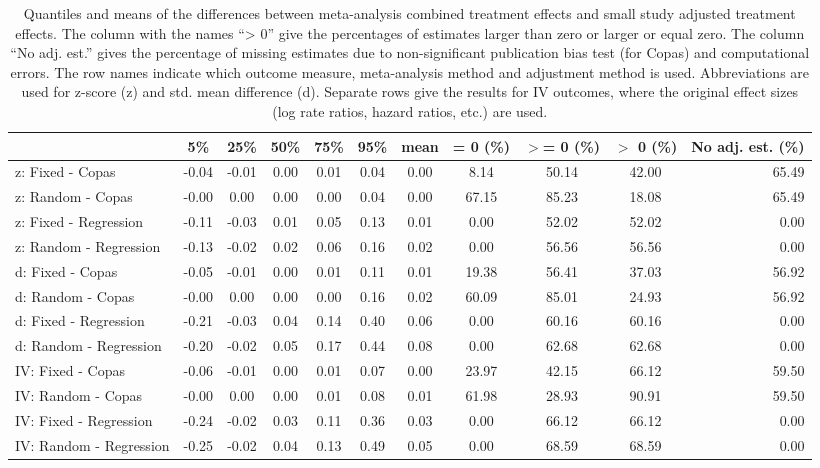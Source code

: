 \documentclass[11pt,a4paper,twoside]{book}\usepackage[]{graphicx}\usepackage[]{color}
\begin{document}
\begin{table}[ht]
\centering
\begingroup\scriptsize
\begin{tabular}{lcccccccccr}
  \hline
 & 5\% & 25\% & 50\% & 75\% & 95\% & mean & = 0 (\%) & $>$= 0 (\%) & $>$ 0 (\%) & No adj. est. (\%) \\ 
  \hline
z: Fixed - Copas & -0.04 & -0.01 & 0.00 & 0.01 & 0.04 & 0.00 & 8.14 & 50.14 & 42.00 & 65.49 \\ 
  z: Random - Copas & -0.00 & 0.00 & 0.00 & 0.00 & 0.04 & 0.00 & 67.15 & 85.23 & 18.08 & 65.49 \\ 
  z: Fixed - Regression & -0.11 & -0.03 & 0.01 & 0.05 & 0.13 & 0.01 & 0.00 & 52.02 & 52.02 & 0.00 \\ 
  z: Random - Regression & -0.13 & -0.02 & 0.02 & 0.06 & 0.16 & 0.02 & 0.00 & 56.56 & 56.56 & 0.00 \\ 
  d: Fixed - Copas & -0.05 & -0.01 & 0.00 & 0.01 & 0.11 & 0.01 & 19.38 & 56.41 & 37.03 & 56.92 \\ 
  d: Random - Copas & -0.00 & 0.00 & 0.00 & 0.00 & 0.16 & 0.02 & 60.09 & 85.01 & 24.93 & 56.92 \\ 
  d: Fixed - Regression & -0.21 & -0.03 & 0.04 & 0.14 & 0.40 & 0.06 & 0.00 & 60.16 & 60.16 & 0.00 \\ 
  d: Random - Regression & -0.20 & -0.02 & 0.05 & 0.17 & 0.44 & 0.08 & 0.00 & 62.68 & 62.68 & 0.00 \\ 
  IV: Fixed - Copas & -0.06 & -0.01 & 0.00 & 0.01 & 0.07 & 0.00 & 23.97 & 42.15 & 66.12 & 59.50 \\ 
  IV: Random - Copas & -0.00 & 0.00 & 0.00 & 0.01 & 0.08 & 0.01 & 61.98 & 28.93 & 90.91 & 59.50 \\ 
  IV: Fixed - Regression & -0.24 & -0.02 & 0.03 & 0.11 & 0.36 & 0.03 & 0.00 & 66.12 & 66.12 & 0.00 \\ 
  IV: Random - Regression & -0.25 & -0.02 & 0.04 & 0.13 & 0.49 & 0.05 & 0.00 & 68.59 & 68.59 & 0.00 \\ 
   \hline
\end{tabular}
\endgroup
\caption{Quantiles and means of the differences between meta-analysis combined treatment effects and small study adjusted treatment effects. The column with the names ``> 0'' give the percentages of estimates larger than zero or larger or equal zero. The column ``No adj. est.'' gives the percentage of missing estimates due to non-significant publication bias test (for Copas) and computational errors. The row names indicate which outcome measure, meta-analysis method and adjustment method is used. Abbreviations are used for z-score (z) and std. mean difference (d). Separate rows give the results for IV outcomes, where the original effect sizes (log rate ratios, hazard ratios, etc.) are used.} 
\label{adjustment.difference}
\end{table}
\end{document}

